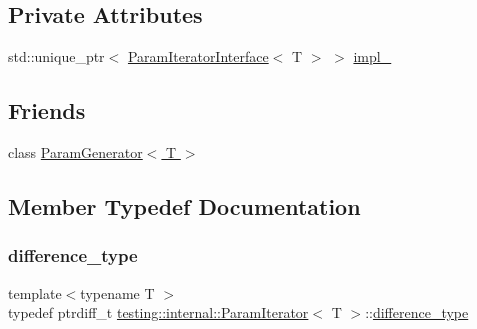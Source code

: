 \subsection*{Private Attributes}
\begin{DoxyCompactItemize}
\item 
std\+::unique\+\_\+ptr$<$ \hyperlink{classtesting_1_1internal_1_1ParamIteratorInterface}{Param\+Iterator\+Interface}$<$ T $>$ $>$ \hyperlink{classtesting_1_1internal_1_1ParamIterator_ab8ca1e4a23e205e4edded0adf42634c9}{impl\+\_\+}
\end{DoxyCompactItemize}
\subsection*{Friends}
\begin{DoxyCompactItemize}
\item 
class \hyperlink{classtesting_1_1internal_1_1ParamIterator_ab73a355ae191f2f7eab54b65ca557714}{Param\+Generator$<$ T $>$}
\end{DoxyCompactItemize}


\subsection{Member Typedef Documentation}
\mbox{\label{classtesting_1_1internal_1_1ParamIterator_a6c37240a04ba3fc4c56f6c413cf4771d}} 
\subsubsection{\texorpdfstring{difference\+\_\+type}{difference\_type}}
{\footnotesize\ttfamily template$<$typename T $>$ \\
typedef ptrdiff\+\_\+t \hyperlink{classtesting_1_1internal_1_1ParamIterator}{testing\+::internal\+::\+Param\+Iterator}$<$ T $>$\+::\hyperlink{classtesting_1_1internal_1_1ParamIterator_a6c37240a04ba3fc4c56f6c413cf4771d}{difference\+\_\+type}}

\mbox{\label{classtesting_1_1internal_1_1ParamIterator_ac96f133ffa06fc0f9faff5a1c7954382}} 

